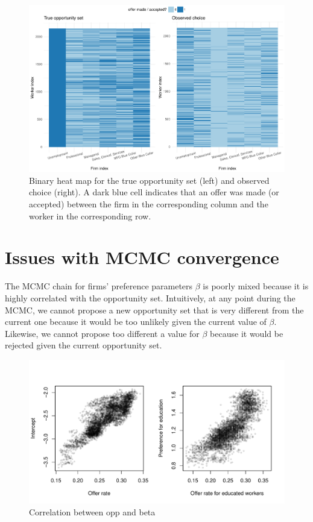 \begin{figure}[!ht]
  \centering
  \includegraphics[width=\textwidth,keepaspectratio]{../figure/sim_labor_nojobs_trueopp_obschoice}
  \caption[True opportunity set vs observed choice.]{Binary heat map for the true opportunity set (left) and observed
    choice (right). A dark blue cell indicates that an offer was made (or accepted)
    between the firm in the corresponding column and the worker in the corresponding
    row.}
  \label{fig:sim_labor_nojobs_trueopp_obschoice}
\end{figure}

\section{Issues with MCMC convergence}
\label{sec:simulation_beta_opp_correlation}

The MCMC chain for firms' preference parameters $\beta$ is poorly mixed because
it is highly correlated with the opportunity set. Intuitively, at any point
during the MCMC, we cannot propose a new opportunity set that is very different
from the current one because it would be too unlikely given the current value of
$\beta$. Likewise, we cannot propose too different a value for $\beta$ because
it would be rejected given the current opportunity set.

\begin{figure}[tbp]
  \centering
  \includegraphics[width=\textwidth,keepaspectratio]{../figure/sim_labor_nojobs_opp_beta_correlation_managerial}
  \caption{Correlation between opp and beta}
  \label{fig:sim_labor_nojobs_opp_beta_correlation_managerial}
\end{figure}


